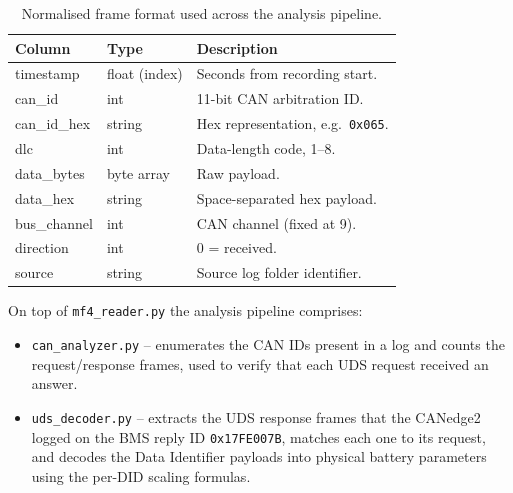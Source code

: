\documentclass[11pt,a4paper,oneside,parskip=half]{scrreprt}
\providecommand{\hex}{}\renewcommand{\hex}[1]{\texttt{0x#1}}
\begin{document}
\begin{table}[H]
\caption{Normalised frame format used across the analysis pipeline.}
\label{tab:mf4_columns}
\centering
\begin{tabular}{lll}
\toprule
\textbf{Column} & \textbf{Type}       & \textbf{Description} \\
\midrule
timestamp       & float (index)      & Seconds from recording start. \\
can\_id         & int                & 11-bit CAN arbitration ID. \\
can\_id\_hex    & string             & Hex representation, e.g.\ \texttt{0x065}. \\
dlc             & int                & Data-length code, 1--8. \\
data\_bytes     & byte array         & Raw payload. \\
data\_hex       & string             & Space-separated hex payload. \\
bus\_channel    & int                & CAN channel (fixed at 9). \\
direction       & int                & 0 = received. \\
source          & string             & Source log folder identifier. \\
\bottomrule
\end{tabular}
\end{table}

On top of \texttt{mf4\_reader.py} the analysis pipeline comprises:

\begin{itemize}
  \item \texttt{can\_analyzer.py} -- enumerates the CAN IDs present in a log and counts the request/response frames, used to verify that each UDS request received an answer.
  \item \texttt{uds\_decoder.py} -- extracts the UDS response frames that the CANedge2 logged on the BMS reply ID \hex{17FE007B}, matches each one to its request, and decodes the Data Identifier payloads into physical battery parameters using the per-DID scaling formulas.
\end{itemize}
\end{document}
